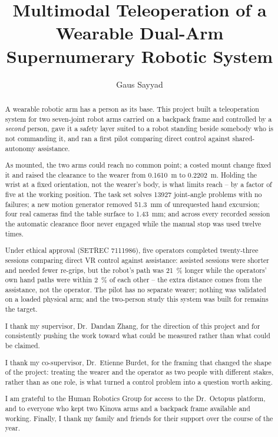 \documentclass[a4paper, twoside, 11pt]{report}
\title{Multimodal Teleoperation of a Wearable Dual-Arm Supernumerary Robotic System}
\author{Gaus Sayyad}
\begin{document}


\begin{abstract}
A wearable robotic arm has a person as its base. This project built a
teleoperation system for two seven-joint robot arms carried on a backpack
frame and controlled by a \emph{second} person, gave it a safety layer
suited to a robot standing beside somebody who is not commanding it, and
ran a first pilot comparing direct control against shared-autonomy
assistance.

As mounted, the two arms could reach no common point; a costed mount change
fixed it and raised the clearance to the wearer from \SI{0.1610}{\metre} to
\SI{0.2202}{\metre}. Holding the wrist at a fixed orientation, not the
wearer's body, is what limits reach -- by a factor of five at the working
position. The task set solves \num{13927} joint-angle problems with no
failures; a new motion generator removed \SI{51.3}{\milli\metre} of
unrequested hand excursion; four real cameras find the table surface to
\SI{1.43}{\milli\metre}; and across every recorded session the automatic
clearance floor never engaged while the manual stop was used twelve times.

Under ethical approval (SETREC 7111986), five operators completed
twenty-three sessions comparing direct VR control against assistance:
assisted sessions were shorter and needed fewer re-grips, but the robot's
path was \SI{21}{\percent} longer while the operators' own hand paths were
within \SI{2}{\percent} of each other -- the extra distance comes from the
assistance, not the operator. The pilot has no separate wearer; nothing was
validated on a loaded physical arm; and the two-person study this system
was built for remains the target.
\end{abstract}

\renewcommand{\abstractname}{Acknowledgements}
\begin{abstract}
I thank my supervisor, Dr.\ Dandan Zhang, for the direction of this project
and for consistently pushing the work toward what could be measured rather
than what could be claimed.

I thank my co-supervisor, Dr.\ Etienne Burdet, for the framing that changed
the shape of the project: treating the wearer and the operator as two people
with different stakes, rather than as one role, is what turned a control
problem into a question worth asking.

I am grateful to the Human Robotics Group for access to the Dr.\ Octopus
platform, and to everyone who kept two Kinova arms and a backpack frame
available and working. Finally, I thank my family and friends for their
support over the course of the year.
\end{abstract}

\tableofcontents











\end{document}
